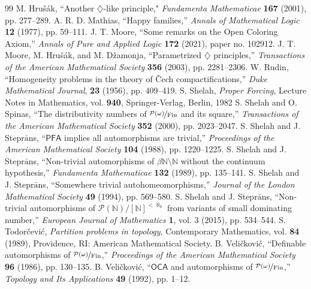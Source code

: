 \documentclass[11pt,leqno]{amsart}
\theoremstyle{definition}
\theoremstyle{remark}
\newcommand{\N}{\mathbb{N}}
\renewcommand{\P}{\mathcal{P}}
\newcommand{\<}{\langle}
\renewcommand{\>}{\rangle}
\renewcommand{\b}{\beta}
\newcommand{\w}{\omega}
\newcommand{\0}{\emptyset}
\newcommand{\1}{1\hspace{-1.75mm}1}
\newcommand{\pwmf}{\nicefrac{\mathcal{P}(\w)}{\mathrm{Fin}}}
\begin{document}
\begin{thebibliography}{99}
 M. Hru\v{s}\'ak, ``Another $\diamondsuit$-like principle," \emph{Fundamenta Mathematicae} \textbf{167} (2001), pp. 277--289.
 A. R. D. Mathias, ``Happy families,'' \emph{Annals of Mathematical Logic} \textbf{12} (1977), pp. 59--111. 
 J. T. Moore, ``Some remarks on the Open Coloring Axiom,'' \emph{Annals of Pure and Applied Logic} \textbf{172} (2021), paper no. 102912. 
 J. T. Moore, M. Hru\v{s}\'ak, and M. D\v{z}amonja, ``Parametrized $\diamondsuit$ principles,'' \emph{Transactions of the American Mathematical Society} \textbf{356} (2003), pp. 2281--2306.
 W. Rudin, ``Homogeneity problems in the theory of \v{C}ech compactifications,'' \emph{Duke Mathematical Journal}, \textbf{23} (1956), pp. 409--419.
 S. Shelah, \emph{Proper Forcing}, Lecture Notes in Mathematics, vol. \textbf{940}, Springer-Verlag, Berlin, 1982
 S. Shelah and O. Spinas, ``The distributivity numbers of $\pwmf$ and its square,'' \emph{Transactions of the American Mathematical Society} \textbf{352} (2000), pp. 2023--2047.
 S. Shelah and J. Stepr$\bar{\mathrm{a}}$ns, ``$\mathsf{PFA}$ implies all automorphisms are trivial,'' \emph{Proceedings of the American Mathematical Society} \textbf{104} (1988), pp. 1220--1225.
 S. Shelah and J. Stepr$\bar{\mathrm{a}}$ns, ``Non-trivial automorphisms of $\b\N \setminus \N$ without the continuum hypothesis,'' \emph{Fundamenta Mathematicae} \textbf{132} (1989), pp. 135--141.
 S. Shelah and J. Stepr$\bar{\mathrm{a}}$ns, ``Somewhere trivial autohomeomorphisms,'' \emph{Journal of the London Mathematical Society} \textbf{49} (1994), pp. 569--580.
 S. Shelah and J. Stepr$\bar{\mathrm{a}}$ns, ``Non-trivial automorphisms of $\P(\N)/[\N]^{<\aleph_0}$ from variants of small dominating number,'' \emph{European Journal of Mathematics} \textbf{1}, vol. 3 (2015), pp. 534--544.
 S. Todor\v{c}evi\'c, \emph{Partition problems in topology}, Contemporary Mathematics, vol. \textbf{84} (1989), Providence, RI: American Mathematical Society.
 B. Veli\v{c}kovi\'c, ``Definable automorphisms of $\pwmf$,'' \emph{Proceedings of the American Mathematical Society} \textbf{96} (1986), pp. 130--135.
 B. Veli\v{c}kovi\'c, ``$\mathsf{OCA}$ and automorphisms of $\pwmf$,'' \emph{Topology and Its Applications} \textbf{49} (1992), pp. 1--12.


\end{thebibliography}
\end{document}
